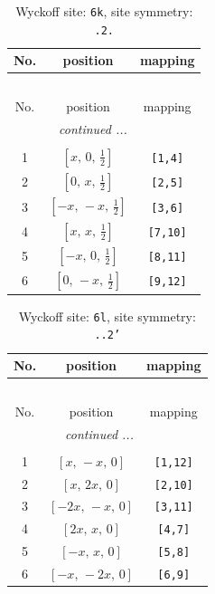 \documentclass[fleqn,8pt]{jsarticle}
\begin{document}
\renewcommand{\arraystretch}{1.2}
\begin{longtable}{ccc}
\caption{Wyckoff site: {\tt 6k}, site symmetry: {\tt .2.}}
 \\
 \hline \hline
No. & position & mapping \\ \hline \endfirsthead

\multicolumn{2}{l}{\tablename\ \thetable{}} \\
 \hline \hline
No. & position & mapping \\ \hline \endhead

 \hline \hline
\multicolumn{2}{r}{\footnotesize\it continued ...} \\ \endfoot

 \hline \hline
\multicolumn{2}{r}{} \\ \endlastfoot

1 & $\left[ x,\, 0,\, \frac{1}{2} \right]$ & {\tt [1,4]} \\ \hline
2 & $\left[ 0,\, x,\, \frac{1}{2} \right]$ & {\tt [2,5]} \\ \hline
3 & $\left[ - x,\, - x,\, \frac{1}{2} \right]$ & {\tt [3,6]} \\ \hline
4 & $\left[ x,\, x,\, \frac{1}{2} \right]$ & {\tt [7,10]} \\ \hline
5 & $\left[ - x,\, 0,\, \frac{1}{2} \right]$ & {\tt [8,11]} \\ \hline
6 & $\left[ 0,\, - x,\, \frac{1}{2} \right]$ & {\tt [9,12]} \\
\end{longtable}
\renewcommand{\arraystretch}{1.2}
\begin{longtable}{ccc}
\caption{Wyckoff site: {\tt 6l}, site symmetry: {\tt ..2'}}
 \\
 \hline \hline
No. & position & mapping \\ \hline \endfirsthead

\multicolumn{2}{l}{\tablename\ \thetable{}} \\
 \hline \hline
No. & position & mapping \\ \hline \endhead

 \hline \hline
\multicolumn{2}{r}{\footnotesize\it continued ...} \\ \endfoot

 \hline \hline
\multicolumn{2}{r}{} \\ \endlastfoot

1 & $\left[ x,\, - x,\, 0 \right]$ & {\tt [1,12]} \\ \hline
2 & $\left[ x,\, 2 x,\, 0 \right]$ & {\tt [2,10]} \\ \hline
3 & $\left[ - 2 x,\, - x,\, 0 \right]$ & {\tt [3,11]} \\ \hline
4 & $\left[ 2 x,\, x,\, 0 \right]$ & {\tt [4,7]} \\ \hline
5 & $\left[ - x,\, x,\, 0 \right]$ & {\tt [5,8]} \\ \hline
6 & $\left[ - x,\, - 2 x,\, 0 \right]$ & {\tt [6,9]} \\
\end{longtable}
\end{document}
